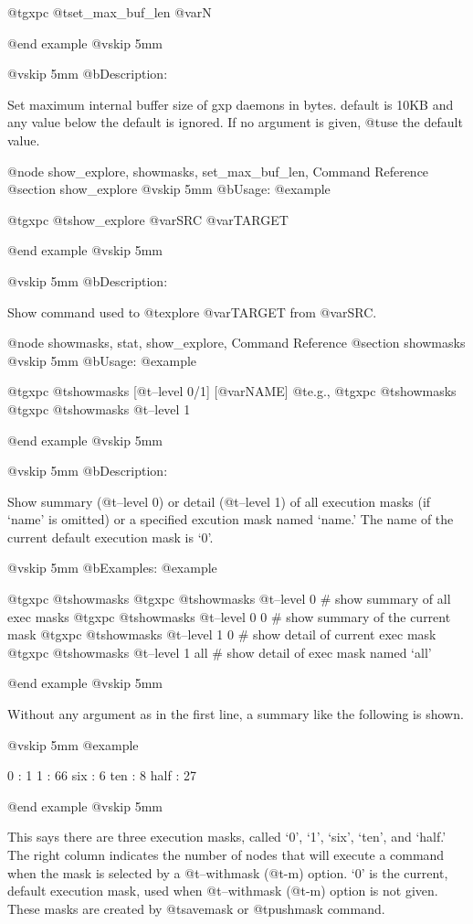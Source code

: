   @t{gxpc} @t{set_max_buf_len} @var{N}

@end example
@vskip 5mm

@vskip 5mm
@b{Description:}


  Set maximum internal buffer size of gxp daemons in bytes.
  default is 10KB and any value below the default is ignored. If no argument
  is given, @t{use} the default value.

@node show_explore, showmasks, set_max_buf_len, Command Reference
@section show_explore
@vskip 5mm
@b{Usage:}
@example

  @t{gxpc} @t{show_explore} @var{SRC} @var{TARGET}

@end example
@vskip 5mm

@vskip 5mm
@b{Description:}


  Show command used to @t{explore} @var{TARGET} from @var{SRC}.

@node showmasks, stat, show_explore, Command Reference
@section showmasks
@vskip 5mm
@b{Usage:}
@example

  @t{gxpc} @t{showmasks} [@t{--level} 0/1] [@var{NAME}]
  @t{e}.g.,
  @t{gxpc} @t{showmasks}
  @t{gxpc} @t{showmasks} @t{--level} 1

@end example
@vskip 5mm

@vskip 5mm
@b{Description:}


  Show summary (@t{--level} 0) or detail (@t{--level} 1) of all execution
masks (if `name' is omitted) or a specified excution mask named
`name.' The name of the current default execution mask is `0'.

@vskip 5mm
@b{Examples:}
@example

  @t{gxpc} @t{showmasks}
  @t{gxpc} @t{showmasks} @t{--level} 0     # show summary of all exec masks
  @t{gxpc} @t{showmasks} @t{--level} 0 0   # show summary of the current mask
  @t{gxpc} @t{showmasks} @t{--level} 1 0   # show detail of current exec mask
  @t{gxpc} @t{showmasks} @t{--level} 1 all # show detail of exec mask named `all'

@end example
@vskip 5mm

Without any argument as in the first line, a summary like the
following is shown.

@vskip 5mm
@example

   0 : 1
   1 : 66
   six : 6
   ten : 8
   half : 27

@end example
@vskip 5mm

This says there are three execution masks, called `0', `1',
`six', `ten', and `half.' The right column indicates the number
of nodes that will execute a command when the mask is selected by
a @t{--withmask} (@t{-m}) option. `0' is the current, default execution
mask, used when @t{--withmask} (@t{-m}) option is not given. These
masks are created by @t{savemask} or @t{pushmask} command.

